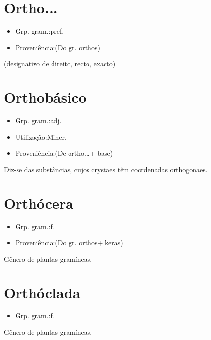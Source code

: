 \section{Ortho...}
\begin{itemize}
\item {Grp. gram.:pref.}
\end{itemize}
\begin{itemize}
\item {Proveniência:(Do gr. \textunderscore orthos\textunderscore )}
\end{itemize}
(designativo de \textunderscore direito\textunderscore , \textunderscore recto\textunderscore , \textunderscore exacto\textunderscore )
\section{Orthobásico}
\begin{itemize}
\item {Grp. gram.:adj.}
\end{itemize}
\begin{itemize}
\item {Utilização:Miner.}
\end{itemize}
\begin{itemize}
\item {Proveniência:(De \textunderscore ortho...\textunderscore  + \textunderscore base\textunderscore )}
\end{itemize}
Diz-se das substâncias, cujos crystaes têm coordenadas orthogonaes.
\section{Orthócera}
\begin{itemize}
\item {Grp. gram.:f.}
\end{itemize}
\begin{itemize}
\item {Proveniência:(Do gr. \textunderscore orthos\textunderscore  + \textunderscore keras\textunderscore )}
\end{itemize}
Gênero de plantas gramíneas.
\section{Orthóclada}
\begin{itemize}
\item {Grp. gram.:f.}
\end{itemize}
Gênero de plantas gramíneas.
